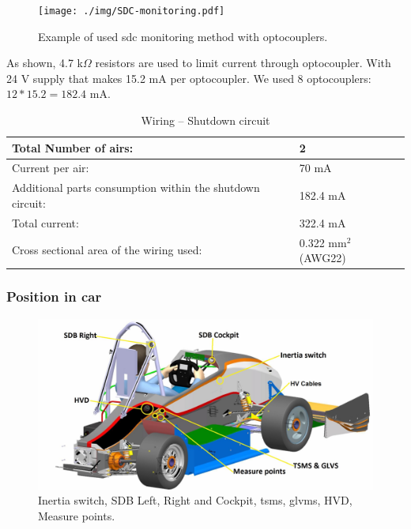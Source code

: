 \begin{figure}[H]
	\centering
	\texttt{[image: ./img/SDC-monitoring.pdf]}
	\caption{Example of used \gls{sdc} monitoring method with optocouplers.}
	\label{fig:SDC-schematic}
\end{figure}

As shown, 4.7 k$\Omega$ resistors are used to limit current through optocoupler. With 24 V supply that makes 15.2 mA per optocoupler. We used 8 optocouplers: $12*15.2= 182.4$ mA.
\begin{table}[H]
	\centering
	\caption{Wiring – Shutdown circuit}
	\begin{tabu}{|X|X|}
		\hline
		Total Number of \glspl{air}: & 2 \\
		\hline
		Current per \gls{air}: & 70 mA \\
		\hline
		Additional parts consumption within the shutdown circuit: & 182.4 mA \\
		\hline
		Total current: & 322.4 mA \\
		\hline
		Cross sectional area of the wiring used: & 0.322 mm$^2$ (AWG22) \\
		\hline
	\end{tabu}%
	\label{tab:SDC-Wiring}%
\end{table}%


\subsubsection{Position in car}

\begin{figure}[H]
	\includegraphics[width=\textwidth]{./img/car-pos.jpg}
	\caption{Inertia switch, SDB Left, Right and Cockpit, \gls{tsms}, \gls{glvms}, HVD, Measure points.}
	\label{fig:SDC-positionInCar}
\end{figure}
